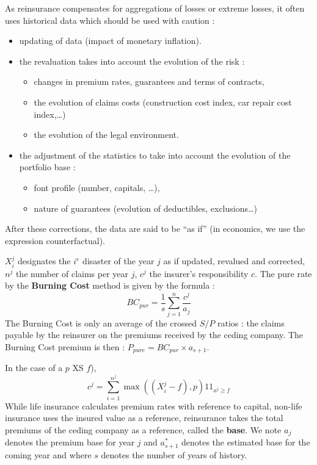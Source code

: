 \begin{f}

As reinsurance compensates for aggregations of losses or extreme losses, it often uses historical data which should be used with caution :
\begin{itemize}
	\item updating of data (impact of monetary inflation).
	\item the revaluation takes into account the evolution of the risk :
	\begin{itemize}
		\item changes in premium rates, guarantees and terms of contracts,
		\item the evolution of claims costs (construction cost index, car repair cost index,\ldots)
		\item the evolution of the legal environment.
	\end{itemize}
	\item the adjustment of the statistics to take into account the evolution of the portfolio base :
	\begin{itemize}
		\item font profile (number, capitals, \ldots),
		\item nature of guarantees (evolution of deductibles, exclusions\ldots)
	\end{itemize}
\end{itemize}
After these corrections, the data are said to be \enquote{as if} (in economics, we use the expression counterfactual).

\end{f}


\begin{f}
	
	\(X_{i}^{j}\) designates the \(i^{e}\) disaster of the year \(j\) \og{}as if\fg{} updated, revalued and corrected,
\(n^j\) the number of claims per year \(j\), \(c^{j}\) the insurer's responsibility \(c\).
The pure rate by the \textbf{Burning Cost} method is given by the formula :
\[
BC_{pur}=\frac{1}{s}\sum_{j=1}^{n}\frac{c^{j}}{a_{j}}
\] 
The Burning Cost is only an average of the crossed \(S/P\) ratios : the claims payable by the reinsurer on the premiums received by the ceding company.
The Burning Cost premium is then : \(P_{pure}=BC_{pur}\times a_{s+1}\).

In the case of a \(p\) XS \(f\)), \[
c^{j}=\sum_{i=1}^{n^j}\max\left(  \left( X_{i}^{j}-f\right),p\right) 1\!\!1_{x^{j}\geq f}
\]
While life insurance calculates premium rates with reference to capital, non-life insurance uses the insured value as a reference, reinsurance takes the total premiums of the ceding company as a reference, called the \textbf{base}.
We note \(a_{j}\) denotes the premium base for year \(j\) and \(a_{s+1}^{*}\) denotes the estimated base for the coming year and where \(s\) denotes the number of years of history.
\end{f}



